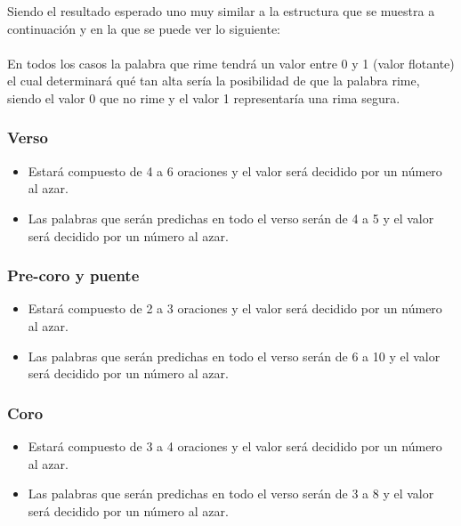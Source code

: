 \documentclass[12pt, a4paper, titlepage]{report}
\begin{document}
		Siendo el resultado esperado uno muy similar a la estructura que se muestra a continuación y en la que se puede ver lo siguiente:\\\\
		En todos los casos la palabra que rime tendrá un valor entre 0 y 1 (valor flotante) el cual determinará qué tan alta sería la posibilidad de que la palabra rime, siendo el valor 0 que no rime y el valor 1 representaría una rima segura. \\
		
		\subsubsection{Verso}
		\begin{itemize}
			\item Estará compuesto de 4 a 6 oraciones y el valor será decidido por un número al azar.
			\item Las palabras que serán predichas en todo el verso serán de 4 a 5 y el valor será decidido por un número al azar.
		\end{itemize}
		
		\subsubsection{Pre-coro y puente}
		\begin{itemize}
			\item Estará compuesto de 2 a 3 oraciones y el valor será decidido por un número al azar.
			\item Las palabras que serán predichas en todo el verso serán de 6 a 10 y el valor será decidido por un número al azar.
		\end{itemize}
	
		\subsubsection{Coro}
		\begin{itemize}
			\item Estará compuesto de 3 a 4 oraciones y el valor será decidido por un número al azar.
			\item Las palabras que serán predichas en todo el verso serán de 3 a 8 y el valor será decidido por un número al azar.
		\end{itemize}
		
\end{document}
